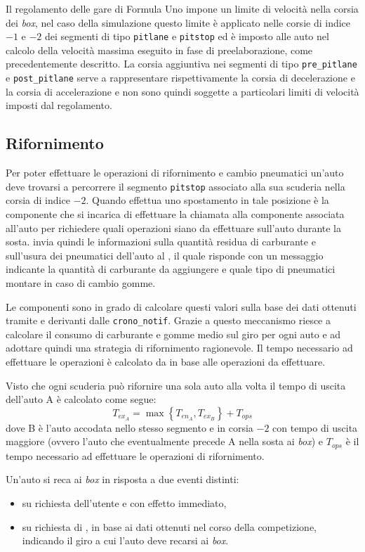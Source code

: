 Il regolamento delle gare di Formula Uno impone un limite di velocità nella corsia dei \textit{box}, nel caso della simulazione questo limite è applicato nelle corsie di indice $-1$ e $-2$ dei segmenti di tipo \texttt{pitlane} e \texttt{pitstop} ed è imposto alle auto nel calcolo della velocità massima eseguito in fase di preelaborazione, come precedentemente descritto.
La corsia aggiuntiva nei segmenti di tipo \texttt{pre\_pitlane} e \texttt{post\_pitlane} serve a rappresentare rispettivamente la corsia di decelerazione e la corsia di accelerazione e non sono quindi soggette a particolari limiti di velocità imposti dal regolamento.

\subsection{Rifornimento}
\label{sec:rifornimento}
Per poter effettuare le operazioni di rifornimento e cambio pneumatici un'auto deve trovarsi a percorrere il segmento \texttt{pitstop} associato alla sua scuderia nella corsia di indice $-2$. Quando \car{} effettua uno spostamento in tale posizione è la componente \track{} che si incarica di effettuare la chiamata alla componente \team{} associata all'auto per richiedere quali operazioni siano da effettuare sull'auto durante la sosta. \track{} invia quindi le informazioni sulla quantità residua di carburante e sull'usura dei pneumatici dell'auto al \team{}, il quale risponde con un messaggio indicante la quantità di carburante da aggiungere e quale tipo di pneumatici montare in caso di cambio gomme.

Le componenti \team{} sono in grado di calcolare questi valori sulla base dei dati ottenuti tramite \evdisp{} e derivanti dalle \texttt{crono\_notif}. Grazie a questo meccanismo \team{} riesce a calcolare il consumo di carburante e gomme medio sul giro per ogni auto e ad adottare quindi una strategia di rifornimento ragionevole.
Il tempo necessario ad effettuare le operazioni è calcolato da \track{} in base alle operazioni da effettuare.

Visto che ogni scuderia può rifornire una sola auto alla volta il tempo di uscita dell'auto A è calcolato come segue:
\[ T_{ex_A} = \max \left\{ T_{en_A}, T_{ex_B} \right\} + T_{ops} \]
dove B è l'auto accodata nello stesso segmento e in corsia $-2$ con tempo di uscita maggiore (ovvero l'auto che eventualmente precede A nella sosta ai \textit{box}) e $T_{ops}$ è il tempo necessario ad effettuare le operazioni di rifornimento.


Un'auto si reca ai \textit{box} in risposta a due eventi distinti:
\begin{itemize}
\item su richiesta dell'utente e con effetto immediato,
\item su richiesta di \team{}, in base ai dati ottenuti nel corso della competizione, indicando il giro a cui l'auto deve recarsi ai \textit{box}.
\end{itemize}

